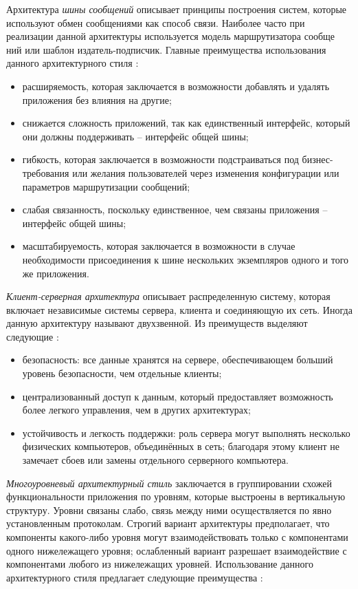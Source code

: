 Архитектура \emph{шины сообщений} описывает принципы построения систем,
которые используют обмен сообщениями как способ связи. Наиболее часто при
реализации данной архитектуры используется модель маршрутизатора сообще
ний или шаблон издатель-подписчик. Главные преимущества использования
данного архитектурного стиля \cite{application_architecture_guide}:

\begin{itemize}
	\item расширяемость, которая заключается в возможности добавлять и удалять приложения без влияния на другие;
	\item снижается сложность приложений, так как единственный интерфейс, который они должны поддерживать – интерфейс общей шины;
	\item гибкость, которая заключается в возможности подстраиваться под бизнес-требования или желания пользователей через изменения конфигурации или параметров маршрутизации сообщений;
	\item слабая связанность, поскольку единственное, чем связаны приложения -- интерфейс общей шины;
  	\item масштабируемость, которая заключается в возможности в случае необходимости присоединения к шине нескольких экземпляров одного и того же приложения.
\end{itemize} 

\emph{Клиент-серверная архитектура} описывает распределенную систему, которая включает независимые системы сервера, клиента и соединяющую их
сеть. Иногда данную архитектуру называют двухзвенной. Из преимуществ выделяют следующие  \cite{introduction_to_architecture}:

\begin{itemize}
	\item безопасность: все данные хранятся на сервере, обеспечивающем больший уровень безопасности, чем отдельные клиенты;
	\item централизованный доступ к данным, который предоставляет возможность более легкого управления, чем в других архитектурах;
	\item устойчивость и легкость поддержки: роль сервера могут выполнять несколько физических компьютеров, объединённых в сеть; благодаря этому клиент не замечает сбоев или замены отдельного серверного компьютера.  
\end{itemize} 

\emph{Многоуровневый архитектурный стиль} заключается в группировании
схожей функциональности приложения по уровням, которые выстроены в вертикальную структуру. Уровни связаны слабо, связь между ними осуществляется по явно 
установленным протоколам. Строгий вариант архитектуры предполагает, что компоненты какого-либо уровня могут взаимодействовать только с
компонентами одного нижележащего уровня; ослабленный вариант разрешает
взаимодействие с компонентами любого из нижележащих уровней. Использование данного архитектурного стиля предлагает следующие преимущества
\cite{application_architecture_guide}:

